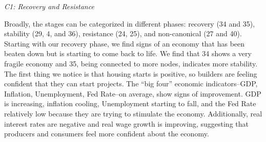 \documentclass[
  10pt,
  letterpaper,
  DIV=11,
  numbers=noendperiod]{scrartcl}
\begin{document}
\emph{C1: Recovery and Resistance}

Broadly, the stages can be categorized in different phases: recovery (34
and 35), stability (29, 4, and 36), resistance (24, 25), and
non-canonical (27 and 40). Starting with our recovery phase, we find
signs of an economy that has been beaten down but is starting to come
back to life. We find that 34 shows a very fragile economy and 35, being
connected to more nodes, indicates more stability. The first thing we
notice is that housing starts is positive, so builders are feeling
confident that they can start projects. The ``big four'' economic
indicators--GDP, Inflation, Unemployment, Fed Rate--on average, show
signs of improvement. GDP is increasing, inflation cooling, Unemployment
starting to fall, and the Fed Rate relatively low because they are
trying to stimulate the economy. Additionally, real interest rates are
negative and real wage growth is improving, suggesting that producers
and consumers feel more confident about the economy.
\end{document}
